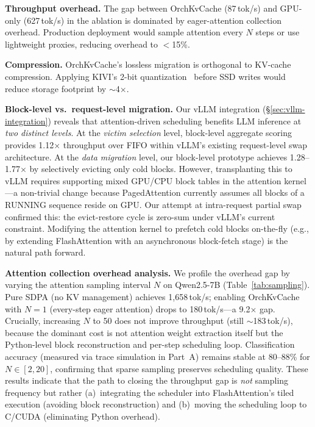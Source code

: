 \documentclass[conference]{IEEEtran}
\begin{document}
\textbf{Throughput overhead.} The gap between OrchKvCache (87\,tok/s) and GPU-only (627\,tok/s) in the ablation is dominated by eager-attention collection overhead. Production deployment would sample attention every $N$ steps or use lightweight proxies, reducing overhead to $<$15\%.

\textbf{Compression.} OrchKvCache's lossless migration is orthogonal to KV-cache compression. Applying KIVI's 2-bit quantization~\cite{kivi} before SSD writes would reduce storage footprint by ${\sim}$4$\times$.

\textbf{Block-level vs.\ request-level migration.}
\label{sec:discussion}
Our vLLM integration (\S\ref{sec:vllm-integration}) reveals that attention-driven scheduling benefits LLM inference at \emph{two distinct levels}. At the \emph{victim selection} level, block-level aggregate scoring provides 1.12$\times$ throughput over FIFO within vLLM's existing request-level swap architecture. At the \emph{data migration} level, our block-level prototype achieves 1.28--1.77$\times$ by selectively evicting only cold blocks. However, transplanting this to vLLM requires supporting mixed GPU/CPU block tables in the attention kernel---a non-trivial change because PagedAttention currently assumes all blocks of a RUNNING sequence reside on GPU. Our attempt at intra-request partial swap confirmed this: the evict-restore cycle is zero-sum under vLLM's current constraint. Modifying the attention kernel to prefetch cold blocks on-the-fly (e.g., by extending FlashAttention with an asynchronous block-fetch stage) is the natural path forward.

\textbf{Attention collection overhead analysis.}
We profile the overhead gap by varying the attention sampling interval $N$ on Qwen2.5-7B (Table~\ref{tab:sampling}). Pure SDPA (no KV management) achieves 1,658\,tok/s; enabling OrchKvCache with $N{=}1$ (every-step eager attention) drops to 180\,tok/s---a 9.2$\times$ gap. Crucially, increasing $N$ to 50 does not improve throughput (still ${\sim}$183\,tok/s), because the dominant cost is not attention weight extraction itself but the Python-level block reconstruction and per-step scheduling loop. Classification accuracy (measured via trace simulation in Part~A) remains stable at 80--88\% for $N \in [2, 20]$, confirming that sparse sampling preserves scheduling quality. These results indicate that the path to closing the throughput gap is \emph{not} sampling frequency but rather (a)~integrating the scheduler into FlashAttention's tiled execution (avoiding block reconstruction) and (b)~moving the scheduling loop to C/CUDA (eliminating Python overhead).
\end{document}
